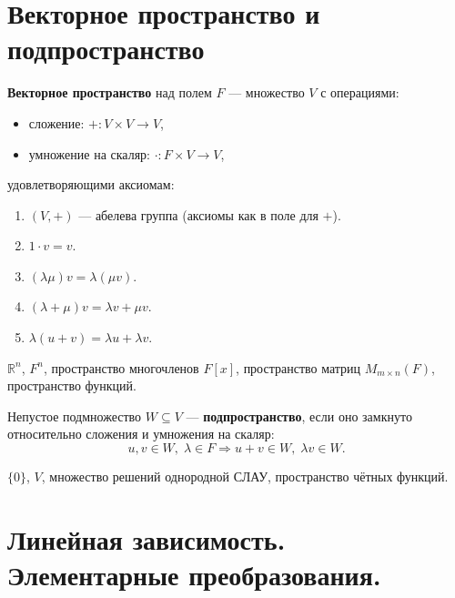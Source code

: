 \documentclass[12pt]{article}
\begin{document}
\section{Векторное пространство и подпространство}

\begin{definition}
\textbf{Векторное пространство} над полем $F$ --- множество $V$
с операциями:
\begin{itemize}
\item сложение: $+ \colon V \times V \to V$,
\item умножение на скаляр: $\cdot \colon F \times V \to V$,
\end{itemize}
удовлетворяющими аксиомам:
\begin{enumerate}[(В1)]
\item $(V, +)$ --- абелева группа (аксиомы как в поле для $+$).
\item $1 \cdot v = v$.
\item $(\lambda\mu)v = \lambda(\mu v)$.
\item $(\lambda + \mu)v = \lambda v + \mu v$.
\item $\lambda(u + v) = \lambda u + \lambda v$.
\end{enumerate}
\end{definition}

\begin{example}
$\mathbb{R}^n$, $F^n$, пространство многочленов $F[x]$,
пространство матриц $M_{m\times n}(F)$, пространство функций.
\end{example}

\begin{definition}
Непустое подмножество $W \subseteq V$ --- \textbf{подпространство},
если оно замкнуто относительно сложения и умножения на скаляр:
\[
u, v \in W,\; \lambda \in F \Rightarrow u + v \in W,\; \lambda v \in W.
\]
\end{definition}

\begin{example}
$\{0\}$, $V$, множество решений однородной СЛАУ, пространство чётных функций.
\end{example}

\section{Линейная зависимость. Элементарные преобразования.}
\end{document}
